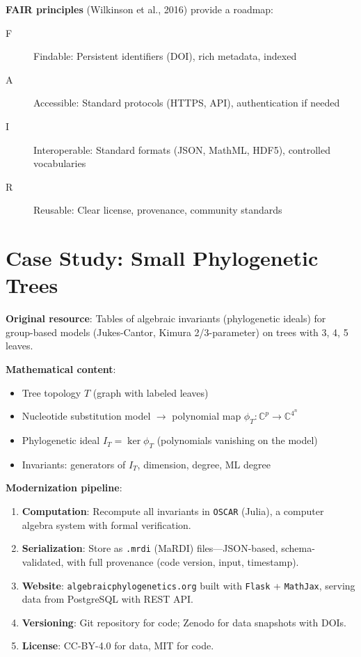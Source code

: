 \textbf{FAIR principles} (Wilkinson et al., 2016) provide a roadmap: \cite{bacher2026fair}
\begin{description}
    \item[F] Findable: Persistent identifiers (DOI), rich metadata, indexed
    \item[A] Accessible: Standard protocols (HTTPS, API), authentication if needed
    \item[I] Interoperable: Standard formats (JSON, MathML, HDF5), controlled vocabularies
    \item[R] Reusable: Clear license, provenance, community standards
\end{description}

\section{Case Study: Small Phylogenetic Trees}
\label{sec:fair:case}

\textbf{Original resource}: Tables of algebraic invariants (phylogenetic ideals) for group-based models (Jukes-Cantor, Kimura 2/3-parameter) on trees with 3, 4, 5 leaves.

\textbf{Mathematical content}:
\begin{itemize}
    \item Tree topology $T$ (graph with labeled leaves)
    \item Nucleotide substitution model $\to$ polynomial map $\phi_T: \mathbb{C}^p \to \mathbb{C}^{4^n}$
    \item Phylogenetic ideal $I_T = \ker \phi_T$ (polynomials vanishing on the model)
    \item Invariants: generators of $I_T$, dimension, degree, ML degree
\end{itemize}

\textbf{Modernization pipeline}:
\begin{enumerate}
    \item \textbf{Computation}: Recompute all invariants in \texttt{OSCAR} (Julia), a computer algebra system with formal verification.
    \item \textbf{Serialization}: Store as \texttt{.mrdi} (MaRDI) files---JSON-based, schema-validated, with full provenance (code version, input, timestamp).
    \item \textbf{Website}: \texttt{algebraicphylogenetics.org} built with \texttt{Flask} + \texttt{MathJax}, serving data from PostgreSQL with REST API.
    \item \textbf{Versioning}: Git repository for code; Zenodo for data snapshots with DOIs.
    \item \textbf{License}: CC-BY-4.0 for data, MIT for code.
\end{enumerate}

